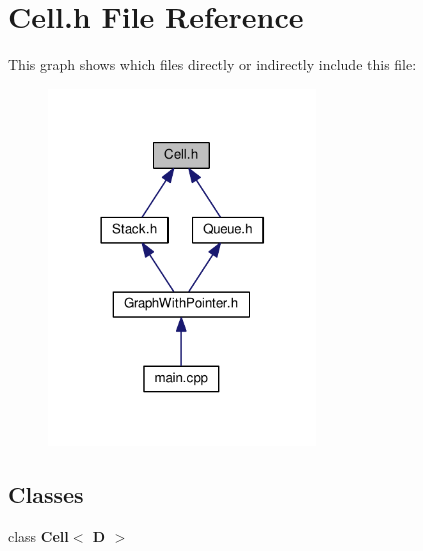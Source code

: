 \section{Cell.\-h File Reference}
\label{_cell_8h}
This graph shows which files directly or indirectly include this file\-:
\nopagebreak
\begin{figure}[H]
\begin{center}
\leavevmode
\includegraphics[width=201pt]{_cell_8h__dep__incl}
\end{center}
\end{figure}
\subsection*{Classes}
\begin{DoxyCompactItemize}
\item 
class {\bf Cell$<$ D $>$}
\end{DoxyCompactItemize}
